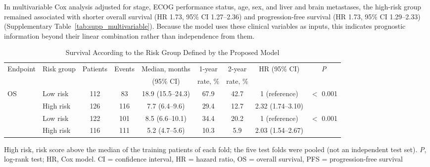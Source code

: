 \documentclass{article}
\begin{document}
In multivariable Cox analysis adjusted for stage, ECOG performance status, age, sex, and liver and brain metastases, the high-risk group remained associated with shorter overall survival (HR 1.73, 95\% CI 1.27--2.36) and progression-free survival (HR 1.73, 95\% CI 1.29--2.33) (Supplementary Table~\ref{tab:supp_multivariable}). Because the model uses these clinical variables as inputs, this indicates prognostic information beyond their linear combination rather than independence from them.

\begin{table}[htbp]
\centering
\setlength{\belowcaptionskip}{4pt}
\caption{Survival According to the Risk Group Defined by the Proposed Model}
\label{tab:risk_groups}
\small\setlength{\tabcolsep}{4pt}
\begin{adjustbox}{max width=\textwidth}
\begin{tabular}{@{}ll cc c cc c c@{}}
\toprule
Endpoint & Risk group & Patients & Events & Median, months & 1-year & 2-year & HR (95\% CI) & \textit{P} \\
 & & & & (95\% CI) & rate, \% & rate, \% & & \\
\midrule
\multirow{2}{*}{OS} & Low risk & 112 & 83 & 18.9 (15.5--24.3) & 67.9 & 42.7 & 1 (reference) & \multirow{2}{*}{$<$ 0.001} \\
 & High risk & 126 & 116 & 7.7 (6.4--9.6) & 29.4 & 12.7 & 2.32 (1.74--3.10) &  \\
\addlinespace
\multirow{2}{*}{PFS} & Low risk & 122 & 101 & 8.5 (6.6--10.1) & 34.4 & 20.2 & 1 (reference) & \multirow{2}{*}{$<$ 0.001} \\
 & High risk & 116 & 111 & 5.2 (4.7--5.6) & 10.3 & 5.9 & 2.03 (1.54--2.67) &  \\
\bottomrule
\end{tabular}%
\end{adjustbox}
\par\smallskip
\begin{minipage}{\textwidth}\footnotesize
High risk, risk score above the median of the training patients of each fold; the five test folds were pooled (not an independent test set). \textit{P}, log-rank test; HR, Cox model. CI = confidence interval, HR = hazard ratio, OS = overall survival, PFS = progression-free survival
\end{minipage}
\end{table}
\end{document}
